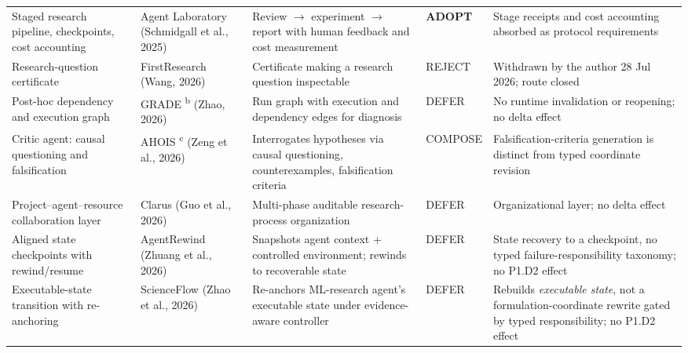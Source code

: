{\begin{longtable}{N{0.60in}N{1.05in}N{1.70in}N{0.60in}N{2.20in}}
  Staged research pipeline, checkpoints, cost accounting & Agent Laboratory (Schmidgall et al., 2025) & Review $\rightarrow$ experiment $\rightarrow$ report with human feedback and cost measurement & \textbf{ADOPT} & Stage receipts and cost accounting absorbed as protocol requirements \\
  Research-question certificate & FirstResearch (Wang, 2026) & Certificate making a research question inspectable & REJECT & Withdrawn by the author 28 Jul 2026; route closed \\
  Post-hoc dependency and execution graph & GRADE \cite{spanlevel2026}\textsuperscript{b} (Zhao, 2026) & Run graph with execution and dependency edges for diagnosis & DEFER & No runtime invalidation or reopening; no delta effect \\
  Critic agent: causal questioning and falsification & AHOIS \cite{selfimproving2026}\textsuperscript{c} (Zeng et al., 2026) & Interrogates hypotheses via causal questioning, counterexamples, falsification criteria & COMPOSE & Falsification-criteria generation is distinct from typed coordinate revision \\
  Project--agent--resource collaboration layer & Clarus (Guo et al., 2026) & Multi-phase auditable research-process organization & DEFER & Organizational layer; no delta effect \\
  Aligned state checkpoints with rewind/resume & AgentRewind \cite{agentrewind2026} (Zhuang et al., 2026) & Snapshots agent context + controlled environment; rewinds to recoverable state & DEFER & State recovery to a checkpoint, no typed failure-responsibility taxonomy; no P1.D2 effect \\
  Executable-state transition with re-anchoring & ScienceFlow \cite{scienceflow2026} (Zhao et al., 2026) & Re-anchors ML-research agent's executable state under evidence-aware controller & DEFER & Rebuilds \emph{executable state}, not a formulation-coordinate rewrite gated by typed responsibility; no P1.D2 effect \\
\end{longtable}
}

